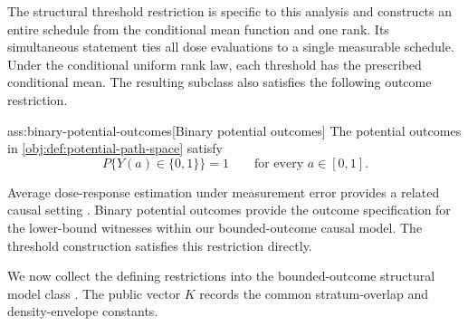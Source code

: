 \documentclass[11pt]{article}
\begin{document}
The structural threshold restriction is specific to this analysis and constructs an entire schedule from the conditional mean function and one rank. Its simultaneous statement ties all dose evaluations to a single measurable schedule. Under the conditional uniform rank law, each threshold has the prescribed conditional mean. The resulting subclass also satisfies the following outcome restriction.

\begin{assumptionv}{ass:binary-potential-outcomes}[Binary potential outcomes]
The potential outcomes in \cref{obj:def:potential-path-space} satisfy
\[
P\{Y(a)\in\{0,1\}\}=1
\qquad
\text{for every }a\in[0,1].
\]
\end{assumptionv}

Average dose-response estimation under measurement error provides a related causal setting \citep{HuangZhang2023}. Binary potential outcomes provide the outcome specification for the lower-bound witnesses within our bounded-outcome causal model. The threshold construction satisfies this restriction directly.

We now collect the defining restrictions into the bounded-outcome structural model class . The public vector \(K\) records the common stratum-overlap and density-envelope constants.
\end{document}
